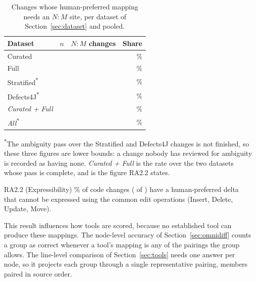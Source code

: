 \documentclass[sigconf,review]{acmart}
\begin{document}
\begin{table}
  \caption{Changes whose human-preferred mapping needs an $N{:}M$ site, per dataset of
  Section~\ref{sec:dataset} and pooled.}
  \label{tab:expressibility}
  \begin{tabular}{lrrr}
    \toprule
    Dataset & $n$ & $N{:}M$ changes & Share \\
    \midrule
    Curated & \AmbiguityCuratedTotal{} & \AmbiguityCuratedWith{} & \AmbiguityCuratedPct{}\% \\
    Full & \AmbiguityFullTotal{} & \AmbiguityFullWith{} & \AmbiguityFullPct{}\% \\
    Stratified\textsuperscript{*} & \AmbiguityStratifiedTotal{} & \AmbiguityStratifiedWith{} &
      \AmbiguityStratifiedPct{}\% \\
    Defects4J\textsuperscript{*} & \AmbiguityDefectsFourJTotal{} & \AmbiguityDefectsFourJWith{} &
      \AmbiguityDefectsFourJPct{}\% \\
    \midrule
    \emph{Curated + Full} & \AmbiguityListScored{} & \AmbiguityListWith{} & \AmbiguityListPct{}\% \\
    \emph{All}\textsuperscript{*} & \AmbiguityScored{} & \AmbiguityAnyFixtures{} &
      \AmbiguityAnyPct{}\% \\
    \bottomrule
  \end{tabular}

  \vspace{2pt}
  \footnotesize\textsuperscript{*}The ambiguity pass over the Stratified and Defects4J changes is
  not finished, so these three figures are lower bounds: a change nobody has reviewed for ambiguity
  is recorded as having none. \emph{Curated + Full} is the rate over the two datasets whose pass is
  complete, and is the figure RA2.2 states.
\end{table}

\begin{resultbox}{RA2.2 (Expressibility)}
  \AmbiguityListPct{}\% of code changes (\AmbiguityListWith{} of \AmbiguityListScored{}) have a
  human-preferred delta that cannot be expressed using the common edit operations
  (Insert, Delete, Update, Move).
\end{resultbox}

This result influences how tools are scored, because no established tool can produce these
mappings. The node-level accuracy of Section~\ref{sec:omnidiff} counts a group as correct whenever
a tool's mapping is any of the pairings the group allows. The line-level comparison of
Section~\ref{sec:tools} needs one answer per node, so it projects each group through a single
representative pairing, members paired in source order.
\end{document}
